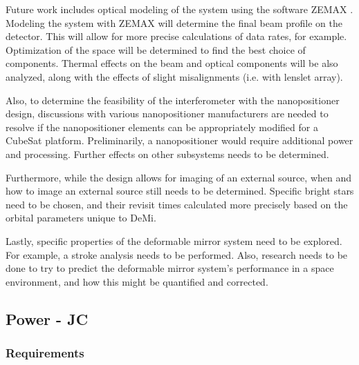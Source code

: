 \documentclass[12pt]{article}
\begin{document}
Future work includes optical modeling of the system using the software ZEMAX \cite{zemax}. Modeling the system with ZEMAX will determine the
  final beam profile on the detector.  This will allow for more precise calculations of data rates, for example.  Optimization of the space will
  be determined to find the best choice of components.  Thermal
  effects on the beam and optical components will be also analyzed, along with the effects of slight misalignments (i.e. with lenslet array).

Also, to determine the feasibility of the interferometer with the nanopositioner design, discussions with various nanopositioner manufacturers are needed to resolve if the nanopositioner elements can be appropriately modified for a CubeSat platform.  Preliminarily, a nanopositioner would require additional power and processing.  Further effects on other subsystems needs to be determined. 

Furthermore, while the design allows for imaging of an external source, when and how to image an external
  source still needs to be determined. Specific bright stars need to be chosen, and their revisit times calculated more precisely based on the orbital parameters unique to DeMi.

Lastly, specific properties of the deformable mirror system need to be explored.  For example, a stroke analysis needs to be performed.  Also, research needs to be done to try to predict the deformable mirror system's performance in a space environment, and how this might be quantified and corrected.

\newpage
\FloatBarrier
			
		\subsection{Power - JC} \label{sec:power}
			\subsubsection{Requirements}
			
\end{document}
